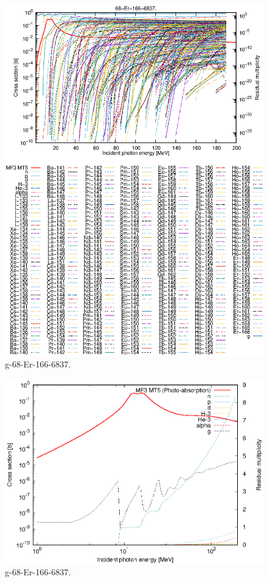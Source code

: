 \begin{figure}
 \includegraphics[width=\linewidth]{eps/g_68-Er-166_6837.eps}
  \caption{g-68-Er-166-6837.}
\end{figure}
\newpage \clearpage

\begin{figure}
 \includegraphics[width=\linewidth]{eps-log/g_68-Er-166_6837.eps}
 \caption{g-68-Er-166-6837.}
\end{figure}
\newpage \clearpage

